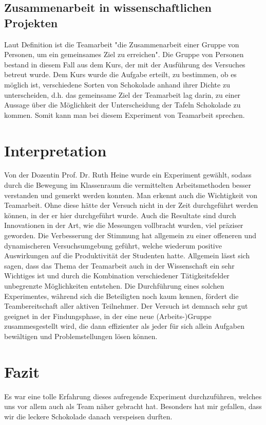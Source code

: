 \documentclass[12pt]{scrartcl}
\begin{document}
\subsection{Zusammenarbeit in wissenschaftlichen Projekten}
Laut Definition ist die Teamarbeit "die Zusammenarbeit einer Gruppe von Personen, um ein gemeinsames Ziel zu erreichen"\cite{Team-def}. Die Gruppe von Personen bestand in diesem Fall aus dem Kurs, der mit der Ausführung des Versuches betreut wurde. Dem Kurs wurde die Aufgabe erteilt, zu bestimmen, ob es möglich ist, verschiedene Sorten von Schokolade anhand ihrer Dichte zu unterscheiden, d.h. das gemeinsame Ziel der Teamarbeit lag darin, zu einer Aussage über die Möglichkeit der Unterscheidung der Tafeln Schokolade zu kommen. Somit kann man bei diesem Experiment von Teamarbeit sprechen.
\section{Interpretation}
Von der Dozentin Prof. Dr. Ruth Heine wurde ein Experiment gewählt, sodass durch die Bewegung im Klassenraum die vermittelten Arbeitsmethoden besser verstanden und gemerkt werden konnten\cite{bewegung}. Man erkennt auch die Wichtigkeit von Teamarbeit. Ohne diese hätte der Versuch nicht in der Zeit durchgeführt werden können, in der er hier durchgeführt wurde. Auch die Resultate sind durch Innovationen in der Art, wie die Messungen vollbracht wurden, viel präziser geworden. Die Verbesserung der Stimmung hat allgemein zu einer offeneren und dynamischeren Versuchsumgebung geführt, welche wiederum positive Auswirkungen auf die Produktivität der Studenten hatte. Allgemein lässt sich sagen, dass das Thema der Teamarbeit auch in der Wissenschaft ein sehr Wichtiges ist und durch die Kombination verschiedener Tätigkeitsfelder unbegrenzte Möglichkeiten entstehen. Die Durchführung eines solchen Experimentes, während sich die Beteiligten noch kaum kennen, fördert die Teambereitschaft aller aktiven Teilnehmer. Der Versuch ist demnach sehr gut geeignet in der Findungsphase, in der eine neue (Arbeits-)Gruppe zusammesgestellt wird, die dann effizienter als jeder für sich allein Aufgaben bewältigen und Problemstellungen lösen können.
\section{Fazit}
Es war eine tolle Erfahrung dieses aufregende Experiment durchzuführen, welches uns vor allem auch als Team näher gebracht hat. Besonders hat mir gefallen, dass wir die leckere Schokolade danach verspeisen durften.
\end{document}
